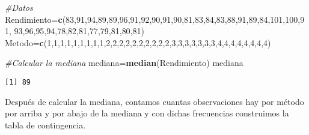 \documentclass[a4paper,oneside,openany]{book}
\newenvironment{Shaded}{\begin{snugshade}}{\end{snugshade}}
\newcommand{\KeywordTok}[1]{\textcolor[rgb]{0.13,0.29,0.53}{\textbf{#1}}}
\newcommand{\DecValTok}[1]{\textcolor[rgb]{0.00,0.00,0.81}{#1}}
\newcommand{\CommentTok}[1]{\textcolor[rgb]{0.56,0.35,0.01}{\textit{#1}}}
\newcommand{\NormalTok}[1]{#1}
\begin{document}
\begin{Shaded}
\begin{Highlighting}[]
\CommentTok{#Datos}
\NormalTok{Rendimiento=}\KeywordTok{c}\NormalTok{(}\DecValTok{83}\NormalTok{,}\DecValTok{91}\NormalTok{,}\DecValTok{94}\NormalTok{,}\DecValTok{89}\NormalTok{,}\DecValTok{89}\NormalTok{,}\DecValTok{96}\NormalTok{,}\DecValTok{91}\NormalTok{,}\DecValTok{92}\NormalTok{,}\DecValTok{90}\NormalTok{,}\DecValTok{91}\NormalTok{,}\DecValTok{90}\NormalTok{,}\DecValTok{81}\NormalTok{,}\DecValTok{83}\NormalTok{,}\DecValTok{84}\NormalTok{,}\DecValTok{83}\NormalTok{,}\DecValTok{88}\NormalTok{,}\DecValTok{91}\NormalTok{,}\DecValTok{89}\NormalTok{,}\DecValTok{84}\NormalTok{,}\DecValTok{101}\NormalTok{,}\DecValTok{100}\NormalTok{,}\DecValTok{91}\NormalTok{,}
              \DecValTok{93}\NormalTok{,}\DecValTok{96}\NormalTok{,}\DecValTok{95}\NormalTok{,}\DecValTok{94}\NormalTok{,}\DecValTok{78}\NormalTok{,}\DecValTok{82}\NormalTok{,}\DecValTok{81}\NormalTok{,}\DecValTok{77}\NormalTok{,}\DecValTok{79}\NormalTok{,}\DecValTok{81}\NormalTok{,}\DecValTok{80}\NormalTok{,}\DecValTok{81}\NormalTok{)}
\NormalTok{Metodo=}\KeywordTok{c}\NormalTok{(}\DecValTok{1}\NormalTok{,}\DecValTok{1}\NormalTok{,}\DecValTok{1}\NormalTok{,}\DecValTok{1}\NormalTok{,}\DecValTok{1}\NormalTok{,}\DecValTok{1}\NormalTok{,}\DecValTok{1}\NormalTok{,}\DecValTok{1}\NormalTok{,}\DecValTok{1}\NormalTok{,}\DecValTok{2}\NormalTok{,}\DecValTok{2}\NormalTok{,}\DecValTok{2}\NormalTok{,}\DecValTok{2}\NormalTok{,}\DecValTok{2}\NormalTok{,}\DecValTok{2}\NormalTok{,}\DecValTok{2}\NormalTok{,}\DecValTok{2}\NormalTok{,}\DecValTok{2}\NormalTok{,}\DecValTok{2}\NormalTok{,}\DecValTok{3}\NormalTok{,}\DecValTok{3}\NormalTok{,}\DecValTok{3}\NormalTok{,}\DecValTok{3}\NormalTok{,}\DecValTok{3}\NormalTok{,}\DecValTok{3}\NormalTok{,}\DecValTok{3}\NormalTok{,}\DecValTok{4}\NormalTok{,}\DecValTok{4}\NormalTok{,}\DecValTok{4}\NormalTok{,}\DecValTok{4}\NormalTok{,}\DecValTok{4}\NormalTok{,}\DecValTok{4}\NormalTok{,}\DecValTok{4}\NormalTok{,}\DecValTok{4}\NormalTok{)}

\CommentTok{#Calcular la mediana}
\NormalTok{mediana=}\KeywordTok{median}\NormalTok{(Rendimiento)}
\NormalTok{mediana}
\end{Highlighting}
\end{Shaded}

\begin{verbatim}
[1] 89
\end{verbatim}

Después de calcular la mediana, contamos cuantas observaciones hay por
método por arriba y por abajo de la mediana y con dichas frecuencias
construimos la tabla de contingencia.
\end{document}
